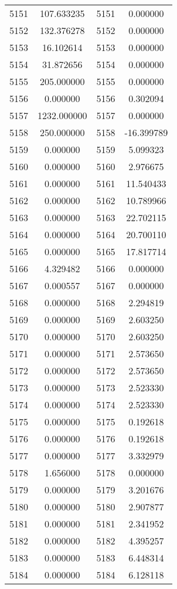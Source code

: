 \documentclass[12pt]{article}
\begin{document}
\begin{longtable}{@{}cccc@{}}
5151 & 107.633235 & 5151 & 0.000000 \\
5152 & 132.376278 & 5152 & 0.000000 \\
5153 & 16.102614 & 5153 & 0.000000 \\
5154 & 31.872656 & 5154 & 0.000000 \\
5155 & 205.000000 & 5155 & 0.000000 \\
5156 & 0.000000 & 5156 & 0.302094 \\
5157 & 1232.000000 & 5157 & 0.000000 \\
5158 & 250.000000 & 5158 & -16.399789 \\
5159 & 0.000000 & 5159 & 5.099323 \\
5160 & 0.000000 & 5160 & 2.976675 \\
5161 & 0.000000 & 5161 & 11.540433 \\
5162 & 0.000000 & 5162 & 10.789966 \\
5163 & 0.000000 & 5163 & 22.702115 \\
5164 & 0.000000 & 5164 & 20.700110 \\
5165 & 0.000000 & 5165 & 17.817714 \\
5166 & 4.329482 & 5166 & 0.000000 \\
5167 & 0.000557 & 5167 & 0.000000 \\
5168 & 0.000000 & 5168 & 2.294819 \\
5169 & 0.000000 & 5169 & 2.603250 \\
5170 & 0.000000 & 5170 & 2.603250 \\
5171 & 0.000000 & 5171 & 2.573650 \\
5172 & 0.000000 & 5172 & 2.573650 \\
5173 & 0.000000 & 5173 & 2.523330 \\
5174 & 0.000000 & 5174 & 2.523330 \\
5175 & 0.000000 & 5175 & 0.192618 \\
5176 & 0.000000 & 5176 & 0.192618 \\
5177 & 0.000000 & 5177 & 3.332979 \\
5178 & 1.656000 & 5178 & 0.000000 \\
5179 & 0.000000 & 5179 & 3.201676 \\
5180 & 0.000000 & 5180 & 2.907877 \\
5181 & 0.000000 & 5181 & 2.341952 \\
5182 & 0.000000 & 5182 & 4.395257 \\
5183 & 0.000000 & 5183 & 6.448314 \\
5184 & 0.000000 & 5184 & 6.128118 \\

\end{longtable}
\end{document}
